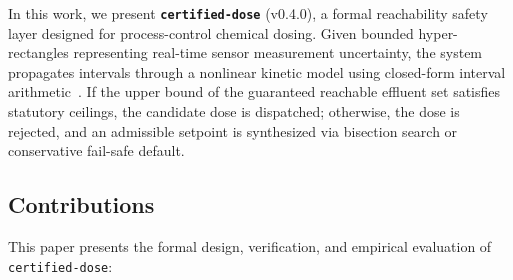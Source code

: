 \documentclass[10pt,twocolumn,letterpaper]{article}
\theoremstyle{definition}
\begin{document}
In this work, we present \textbf{\texttt{certified-dose}} (v0.4.0), a formal reachability safety layer designed for process-control chemical dosing. Given bounded hyper-rectangles representing real-time sensor measurement uncertainty, the system propagates intervals through a nonlinear kinetic model using closed-form interval arithmetic~\cite{moore1966interval}. If the upper bound of the guaranteed reachable effluent set satisfies statutory ceilings, the candidate dose is dispatched; otherwise, the dose is rejected, and an admissible setpoint is synthesized via bisection search or conservative fail-safe default.

\subsection{Contributions}
This paper presents the formal design, verification, and empirical evaluation of \texttt{certified-dose}:
\end{document}
